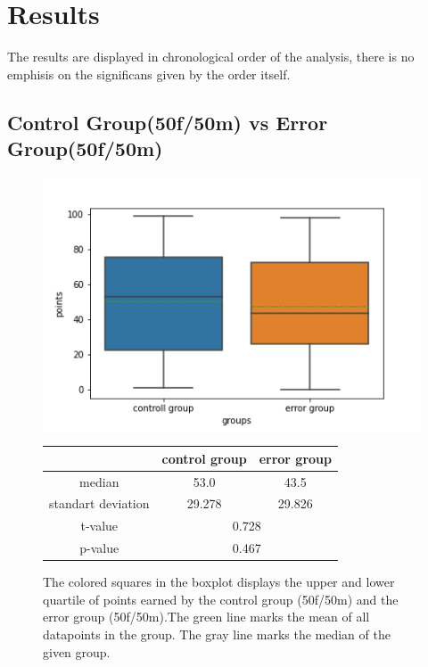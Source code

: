 \documentclass[runningheads]{llncs}
\begin{document}
\clearpage
\section{Results}
The results are displayed in chronological order of the analysis, there is
no emphisis on the significans given by the order itself.

\subsection{Control Group(50f/50m) vs Error Group(50f/50m)}
\begin{figure}[!h]
    \begin{minipage}{0.43\textwidth}        
        \includegraphics[width=\textwidth]{code/generate/all.png}
        \caption{The colored squares in the boxplot displays
        the upper and lower quartile of points earned by the control group (50f/50m) and
        the error group (50f/50m).The green line marks the mean of all datapoints in the group.
        The gray line marks the median  of the given group.} \label{fig2}
    \end{minipage}
\hfill
\begin{minipage}{0.43\textwidth}
\begin{tabular}[]{| c | c | c |}
        \hline
        & control group & error group \\
        \hline
        median & 53.0&43.5 \\
        \hline
        standart deviation & 29.278&29.826 \\
        \hline
        t-value & \multicolumn{2}{c|}{0.728} \\
        \hline
        p-value & \multicolumn{2}{c|}{0.467} \\
        \hline            
\end{tabular}
\end{minipage}
\end{figure}
\end{document}
